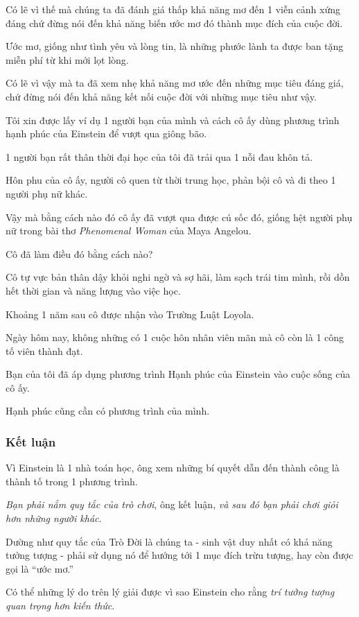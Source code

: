 \documentclass{article}
\begin{document}
Có lẽ vì thế mà chúng ta đã đánh giá thấp khả năng mơ đến 1 viễn cảnh xứng đáng chứ đừng nói đến khả năng biến ước mơ đó thành mục đích của cuộc đời.

Ước mơ, giống như tình yêu và lòng tin, là những phước lành ta được ban tặng miễn phí từ khi mới lọt lòng.

Có lẽ vì vậy mà ta đã xem nhẹ khả năng mơ ước đến những mục tiêu đáng giá, chứ đừng nói đến khả năng kết nối cuộc đời với những mục tiêu như vậy.

%
Tôi xin được lấy ví dụ 1 người bạn của mình và cách cô ấy dùng phương trình hạnh phúc của Einstein để vượt qua giông bão.

%
1 người bạn rất thân thời đại học của tôi đã trải qua 1 nỗi đau khôn tả.

Hôn phu của cô ấy, người cô quen từ thời trung học, phản bội cô và đi theo 1 người phụ nữ khác.

Vậy mà bằng cách nào đó cô ấy đã vượt qua được cú sốc đó, giống hệt người phụ nữ trong bài thơ \textit{Phenomenal Woman} của Maya Angelou.

%
Cô đã làm điều đó bằng cách nào?

%
Cô tự vực bản thân dậy khỏi nghi ngờ và sợ hãi, làm sạch trái tim  mình, rồi dồn hết thời gian và năng lượng vào việc học.

Khoảng 1 năm sau cô được nhận vào Trường Luật Loyola.

%
Ngày hôm nay, không những có 1 cuộc hôn nhân viên mãn mà cô còn là 1 công tố viên thành đạt.

Bạn của tôi đã áp dụng phương trình Hạnh phúc của Einstein vào cuộc sống của cô ấy.

\textsf{Hạnh phúc cũng cần có phương trình của mình.}

\subsubsection{Kết luận}
Vì Einstein là 1 nhà toán học, ông xem những bí quyết dẫn đến thành công là thành tố trong 1 phương trình.

\textit{Bạn phải nắm quy tắc của trò chơi}, ông kết luận, \textit{và sau đó bạn phải chơi giỏi hơn những người khác}.

%
Dường như quy tắc của Trò Đời là chúng ta - sinh vật duy nhất có khả năng tưởng tượng - phải sử dụng nó để hướng tới 1 mục đích trừu tượng, hay còn được gọi là ``ước mơ.''

%
Có thể những lý do trên lý giải được vì sao Einstein cho rằng \textit{trí tưởng tượng quan trọng hơn kiến thức}.
\end{document}
